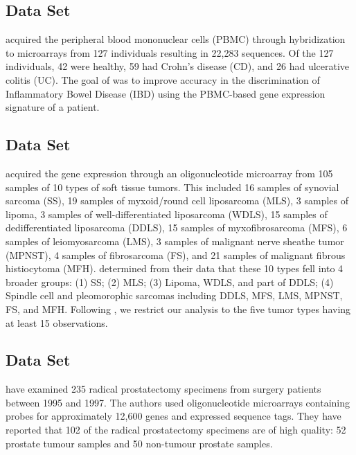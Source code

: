 \documentclass[11pt]{article}
\begin{document}
\subsection{\cite{Burczynski:2006ik} Data Set}

\cite{Burczynski:2006ik} acquired the peripheral blood mononuclear cells (PBMC) through hybridization to microarrays from 127 individuals resulting in 22,283 sequences. Of the 127 individuals, 42 were healthy, 59 had Crohn's disease (CD), and 26 had ulcerative colitis (UC). The goal of \cite{Burczynski:2006ik} was to improve accuracy in the discrimination of Inflammatory Bowel Disease (IBD) using the PBMC-based gene expression signature of a patient.

\subsection{\cite{Nakayama:2007fl} Data Set}

\cite{Nakayama:2007fl} acquired the gene expression through an oligonucleotide microarray from 105 samples of 10 types of soft tissue tumors. This included 16 samples of synovial sarcoma (SS), 19 samples of myxoid/round cell liposarcoma (MLS), 3 samples of lipoma, 3 samples of well-differentiated liposarcoma (WDLS), 15 samples of dedifferentiated liposarcoma (DDLS), 15 samples of myxofibrosarcoma (MFS), 6 samples of leiomyosarcoma (LMS), 3 samples of malignant nerve sheathe tumor (MPNST), 4 samples of fibrosarcoma (FS), and 21 samples of malignant fibrous histiocytoma (MFH). \cite{Nakayama:2007fl} determined from their data that these 10 types fell into 4 broader groups: (1) SS; (2) MLS; (3) Lipoma, WDLS, and part of DDLS; (4) Spindle cell and pleomorophic sarcomas including DDLS, MFS, LMS, MPNST, FS, and MFH. Following \cite{Witten:2011kc}, we restrict our analysis to the five tumor types having at least 15 observations.

\subsection{\cite{Singh:2002fh} Data Set}

\cite{Singh:2002fh} have examined 235 radical prostatectomy specimens from surgery patients between 1995 and 1997. The authors used oligonucleotide microarrays containing probes for approximately 12,600 genes and expressed sequence tags. They have reported that 102 of the radical prostatectomy specimens are of high quality: 52 prostate tumour samples and 50 non-tumour prostate samples.
\end{document}
